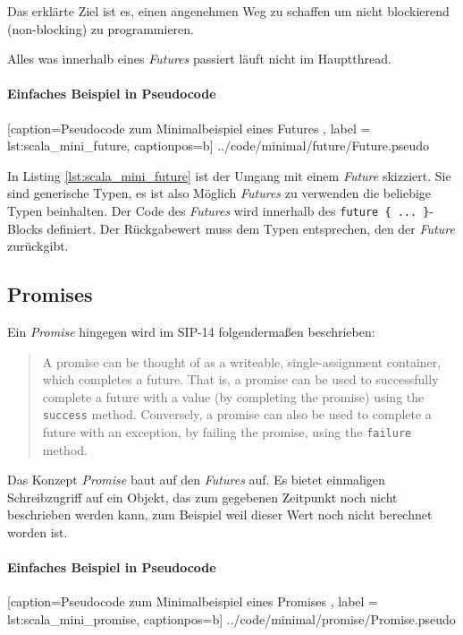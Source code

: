 Das erklärte Ziel ist es, einen angenehmen Weg zu schaffen um nicht
blockierend (\glqq non-blocking\grqq{}) zu programmieren.

Alles was innerhalb eines \emph{Futures} passiert läuft nicht im
Hauptthread.

\paragraph{Einfaches Beispiel in Pseudocode}


    [caption={Pseudocode zum Minimalbeispiel eines Futures },
       label = lst:scala_mini_future,
       captionpos=b]
 {../code/minimal/future/Future.pseudo}
 
In Listing \ref{lst:scala_mini_future} ist der Umgang mit einem \emph{Future}
skizziert. Sie sind generische Typen, es ist also Möglich \emph{Futures}
zu verwenden die beliebige Typen beinhalten. Der Code des \emph{Futures}
wird innerhalb des \texttt{future \{ ... \}}-Blocks definiert. Der
Rückgabewert muss dem Typen entsprechen, den der \emph{Future} zurückgibt.

\subsection{Promises}

Ein \emph{Promise} hingegen wird im SIP-14 folgendermaßen beschrieben:
\begin{quote}
A promise can be thought of as a writeable, single-assignment container, which 
completes a future. That is, a promise can be used to successfully complete a 
future with a value (by \glqq completing\grqq{} the promise) using the \texttt{success} method. 
Conversely, a promise can also be used to complete a future with an exception, 
by failing the promise, using the \texttt{failure} method.
\end{quote}

Das Konzept \emph{Promise} baut auf den \emph{Futures} auf. Es bietet
einmaligen Schreibzugriff auf ein Objekt, das zum gegebenen Zeitpunkt
noch nicht beschrieben werden kann, zum Beispiel weil dieser Wert
noch nicht berechnet worden ist.

\paragraph{Einfaches Beispiel in Pseudocode}


    [caption={Pseudocode zum Minimalbeispiel eines Promises },
       label = lst:scala_mini_promise,
       captionpos=b]
 {../code/minimal/promise/Promise.pseudo}
 
